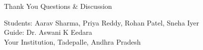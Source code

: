 \documentclass[10pt]{beamer}
\begin{document}
\begin{frame}{Thank You}
    \centering
    \large
    Questions \& Discussion
    \vspace{0.5cm}
    
    \normalsize
    Students: Aarav Sharma, Priya Reddy, Rohan Patel, Sneha Iyer \\
    Guide: Dr. Aswani K Eedara \\
    Your Institution, Tadepalle, Andhra Pradesh
\end{frame}
\end{document}
